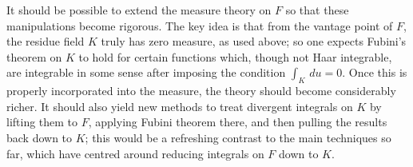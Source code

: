 \documentclass{lmsMODIFIED}
\begin{document}
\begin{remark}
It should be possible to extend the measure theory on $F$ so that these manipulations become rigorous. The key idea is that from the vantage point of $F$, the residue field $K$ truly has zero measure, as used above; so one expects Fubini's theorem on $K$ to hold for certain functions which, though not Haar integrable, are integrable in some sense after imposing the condition $\int_K\,du=0$. Once this is properly incorporated into the measure, the theory should become considerably richer. It should also yield new methods to treat divergent integrals on $K$ by lifting them to $F$, applying Fubini theorem there, and then pulling the results back down to $K$; this would be a refreshing contrast to the main techniques so far, which have centred around reducing integrals on $F$ down to $K$.
\end{remark}
\end{document}
